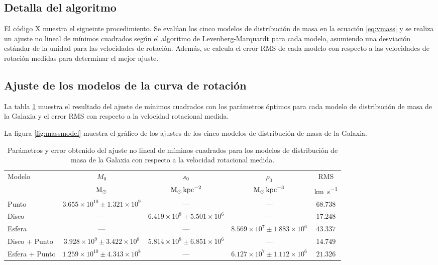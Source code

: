 \subsection{Detalla del algoritmo}

El código X muestra el sigueinte procedimiento. Se evalúan los cinco modelos de distribución de masa en la ecuación \ref{eq:vmass} y se realiza un ajuste no lineal de mínimos cuadrados según el algoritmo de Levenberg-Marquardt para cada modelo, asumiendo una desviación estándar de la unidad para las velocidades de rotación. Además, se calcula el error RMS de cada modelo con respecto a las velocidades de rotación medidas para determinar el mejor ajuste.

\subsection{Ajuste de los modelos de la curva de rotación}

La tabla \ref{tab:massmodel} muestra el resultado del ajuste de mínimos cuadrados con los parámetros óptimos para cada modelo de distribución de masa de la Galaxia y el error RMS con respecto a la velocidad rotacional medida.

La figura \ref{fig:massmodel} muestra el gráfico de los ajustes de los cinco modelos de distribución de masa de la Galaxia.

\begin{table}[htpb]
	\centering
	\begin{tabular}{lcccc}
		\toprule
		{Modelo} &
		{$M_0$} &
		{$s_0$} &
		{$\rho_0$} &
		{RMS} \\
		{} &
		{$\textnormal{M}_\odot$} &
		{$\textnormal{M}_\odot\,\textnormal{kpc}^{-2}$} &
		{$\textnormal{M}_\odot\,\textnormal{kpc}^{-3}$} &
		{\si{\kilo\meter\per\second}} \\
		\midrule
		Punto & $3.655\times10^{10}\pm1.321\times10^{9}$ & --- & --- & $68.738$ \\
		Disco & --- & $6.419\times10^{8}\pm5.501\times10^{6}$ & --- & $17.248$ \\
		Esfera & --- & --- & $8.569\times10^{7}\pm1.883\times10^6$ & $43.337$ \\
		Disco + Punto & $3.928\times10^{9}\pm3.422\times10^{8}$ & $5.814\times10^{8}\pm6.851\times10^{6}$ & --- & $14.749$ \\
		Esfera + Punto & $1.259\times10^{10}\pm4.343\times10^{8}$ & --- & $6.127\times10^{7}\pm1.112\times10^{6}$ & $21.326$ \\
		\bottomrule
	\end{tabular}
	\caption{Parámetros y error obtenido del ajuste no lineal de míminos cuadrados para los modelos de distribución de masa de la Galaxia con respecto a la velocidad rotacional medida.}\label{tab:massmodel}
\end{table}

